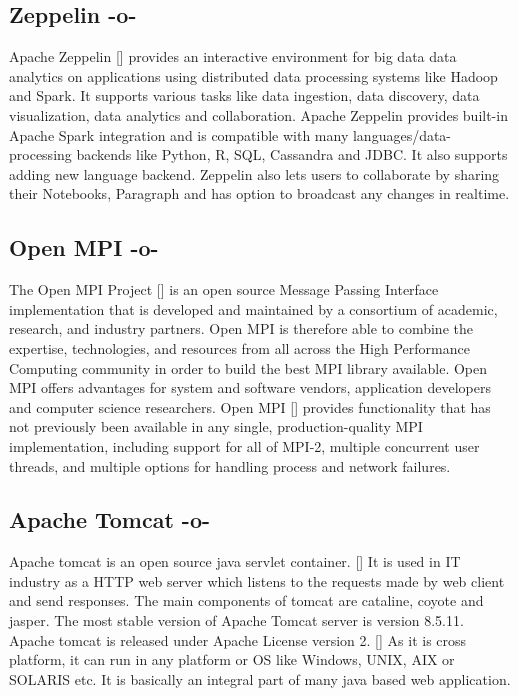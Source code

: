 \subsection{Zeppelin -o-}

Apache Zeppelin [\cite{www-zeppelinwebsite}] provides an interactive
environment for big data data analytics on applications using
distributed data processing systems like Hadoop and Spark. It supports
various tasks like data ingestion, data discovery, data visualization,
data analytics and collaboration. Apache Zeppelin provides built-in
Apache Spark integration and is compatible with many
languages/data-processing backends like Python, R, SQL, Cassandra and
JDBC. It also supports adding new language backend. Zeppelin also lets
users to collaborate by sharing their Notebooks, Paragraph and has
option to broadcast any changes in realtime.

\subsection{Open MPI -o-}

The Open MPI Project [\cite{www-open-mpi}] is an open source Message
Passing Interface implementation that is developed and maintained by a
consortium of academic, research, and industry partners. Open MPI is
therefore able to combine the expertise, technologies, and resources
from all across the High Performance Computing community in order to
build the best MPI library available. Open MPI offers advantages for
system and software vendors, application developers and computer
science researchers. Open MPI [\cite{open-mpi-paper-2004}] provides
functionality that has not previously been available in any single,
production-quality MPI implementation, including support for all of
MPI-2, multiple concurrent user threads, and multiple options for
handling process and network failures.

\subsection{Apache Tomcat -o-}

Apache tomcat is an open source java servlet
container. [\cite{www-tomcat-official}] It is used in IT industry as a
HTTP web server which listens to the requests made by web client and
send responses. The main components of tomcat are cataline, coyote and
jasper. The most stable version of Apache Tomcat server is version
8.5.11. Apache tomcat is released under Apache License version
2. [\cite{www-tomcat-wiki}] As it is cross platform, it can run in any
platform or OS like Windows, UNIX, AIX or SOLARIS etc. It is basically
an integral part of many java based web application.

